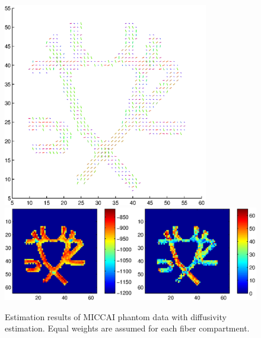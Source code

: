 \documentclass{article}
\begin{document}
\begin{figure}[H]
  \caption{Estimation results of MICCAI phantom data with diffusivity estimation. Equal weights are assumed for each fiber compartment.}
  \centering
  \includegraphics[width=0.8\textwidth]{figures/phantom_bas_diffus_dir.eps}
  \includegraphics[width=\textwidth]{figures/phantom_bas_diffus_like.eps}
\end{figure}
\end{document}
